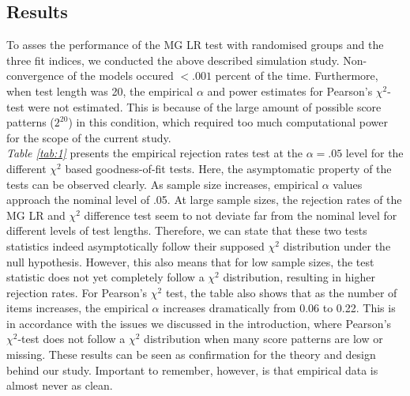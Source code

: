 \documentclass[Royal,sageapa,times,doublespace]{sagej}
\begin{document}
\subsection{Results}

To asses the performance of the MG LR test with randomised groups and the three fit indices, we conducted the above described simulation study. Non-convergence of the models occured $<.001$ percent of the time. Furthermore, when test length was 20, the empirical $\alpha$ and power estimates for Pearson's $\chi^2$-test were not estimated. This is because of the large amount of possible score patterns ($2^20$) in this condition, which required too much computational power for the scope of the current study. \\
\indent \textit{Table \ref{tab:1}} presents the empirical rejection rates test at the $\alpha = .05$ level for the different $\chi^2$ based goodness-of-fit tests. Here, the asymptomatic property of the tests can be observed clearly. As sample size increases, empirical $\alpha$ values approach the nominal level of .05. At large sample sizes, the rejection rates of the MG LR and $\chi^2$ difference test seem to not deviate far from the nominal level for different levels of test lengths. Therefore, we can state that these two tests statistics indeed asymptotically follow their supposed $\chi^2$ distribution under the null hypothesis. However, this also means that for low sample sizes, the test statistic does not yet completely follow a $\chi^2$ distribution, resulting in higher rejection rates. For Pearson's $\chi^2$ test, the table also shows that as the number of items increases, the empirical $\alpha$ increases dramatically from 0.06 to 0.22. This is in accordance with the issues we discussed in the introduction, where Pearson's $\chi^2$-test does not follow a $\chi^2$ distribution when many score patterns are low or missing. These results can be seen as confirmation for the theory and design behind our study. Important to remember, however, is that empirical data is almost never as clean.
\end{document}
